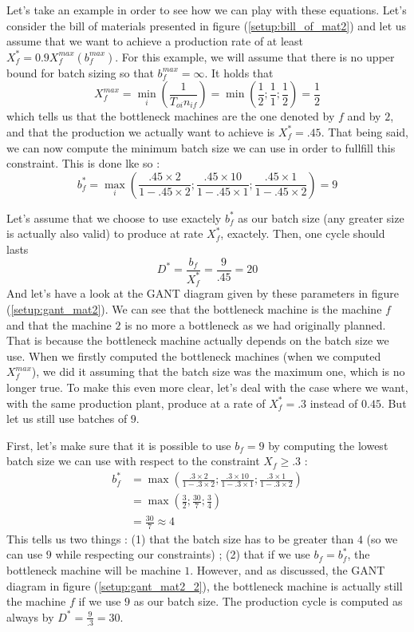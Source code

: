 Let's take an example in order to see how we can play with these equations. Let's consider the bill of materials presented in figure (\ref{setup:bill_of_mat2}) and let us assume that we want to achieve a production rate of at least $X_f^* = 0.9 X_f^{max}(b_f^{max})$. For this example, we will assume that there is no upper bound for batch sizing so that $b_f^{max} = \infty$. It holds that \[ X_f^{max} = \min_i\left( \frac{1}{T_{oi}n_{if}} \right) = \min\left( \frac{1}{2} ; \frac{1}{1} ; \frac{1}{2} \right) = \frac{1}{2} \] which tells us that the bottleneck machines are the one denoted by $f$ and by $2$, and that the production we actually want to achieve is $X_f^* = .45$. That being said, we can now compute the minimum batch size we can use in order to fullfill this constraint. This is done lke so : \[ b_f^* = \max_i\left( \frac{.45\times 2}{1 - .45\times 2} ; \frac{.45\times 10}{1 - .45\times 1} ; \frac{.45\times 1}{1 - .45\times 2} \right) = 9 \]

Let's assume that we choose to use exactely $b_f^*$ as our batch size (any greater size is actually also valid) to produce at rate $X_f^*$, exactely. Then, one cycle should lasts \[ D^* = \frac{b_f}{X_f^*}=\frac{9}{.45} = 20 \] And let's have a look at the GANT diagram given by these parameters in figure (\ref{setup:gant_mat2}). We can see that the bottleneck machine is the machine $f$ and that the machine $2$ is no more a bottleneck as we had originally planned. That is because the bottleneck machine actually depends on the batch size we use. When we firstly computed the bottleneck machines (when we computed $X_f^{max}$), we did it assuming that the batch size was the maximum one, which is no longer true. To make this even more clear, let's deal with the case where we want, with the same production plant, produce at a rate of $X_f^*=.3$ instead of $0.45$. But let us still use batches of $9$. 

First, let's make sure that it is possible to use $b_f = 9$ by computing the lowest batch size we can use with respect to the constraint $X_f\ge .3$ :
\[
    \begin{split}
        b_f^* &= \max\left( \frac{.3\times 2}{1 - .3\times 2} ; \frac{.3\times 10}{1 - .3\times 1} ; \frac{.3\times 1}{1-.3\times 2} \right)\\
        &= \max\left( \frac{3}{2} ; \frac{30}{7} ; \frac{3}{4} \right)\\
        &= \frac{30}{7} \approx 4
    \end{split}
\]
This tells us two things : (1) that the batch size has to be greater than $4$ (so we can use $9$ while respecting our constraints) ; (2) that if we use $b_f = b_f^*$, the bottleneck machine will be machine $1$. However, and as discussed, the GANT diagram in figure (\ref{setup:gant_mat2_2}), the bottleneck machine is actually still the machine $f$ if we use $9$ as our batch size. The production cycle is computed as always by $D^* = \frac{9}{.3} = 30$. 

